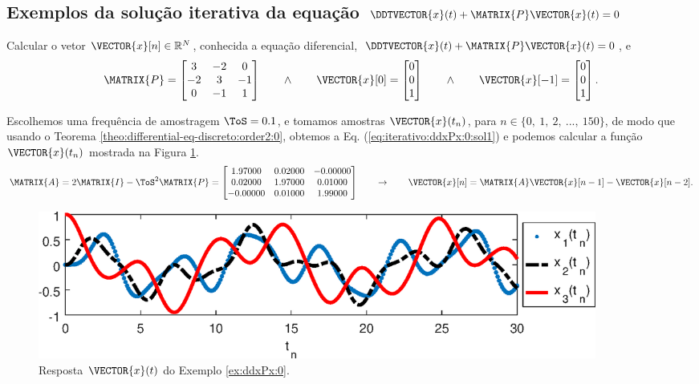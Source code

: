 \subsection{Exemplos da solução iterativa da equação $\DDTVECTOR{x}(t) + \MATRIX{P} \VECTOR{x}(t)=0$}

\begin{example}
\label{ex:iterativo:ddxPx:0}
Calcular o vetor $\VECTOR{x}[n] \in \mathbb{R}^{N}$,
conhecida a equação diferencial, $\DDTVECTOR{x}(t) + \MATRIX{P} \VECTOR{x}(t)=0$, e
\begin{equation}
\MATRIX{P}=
\begin{bmatrix}
3 & -2 & 0\\
-2 & 3 & -1\\
0 & -1 & 1
\end{bmatrix}
\qquad \wedge \qquad
\VECTOR{x}[0]=
\begin{bmatrix}
0\\
0\\
1
\end{bmatrix}
\qquad \wedge \qquad
\VECTOR{x}[-1]=
\begin{bmatrix}
0\\
0\\
1
\end{bmatrix}.
\end{equation}
\end{example}


\begin{SolutionT}
\label{ex:iterativo:ddxPx:0:sol1}
Escolhemos uma frequência de amostragem $\ToS=0.1$, e
tomamos amostras $\VECTOR{x}(t_n)$, para $n \in \{0,~ 1,~ 2,~ ...,~ 150\}$, 
de modo que usando o Teorema \ref{theo:differential-eq-discreto:order2:0}, 
obtemos a Eq. (\ref{eq:iterativo:ddxPx:0:sol1})
e podemos calcular a função $\VECTOR{x}(t_n)$ mostrada na Figura \ref{fig:ex:iterativo:ddxPx:0}.
\begin{equation}\label{eq:iterativo:ddxPx:0:sol1}
\MATRIX{A}=
2\MATRIX{I} -\ToS^2 \MATRIX{P}=
\begin{bmatrix}
   1.97000 & 0.02000 &-0.00000\\
   0.02000 & 1.97000 & 0.01000\\
  -0.00000 & 0.01000 & 1.99000
\end{bmatrix}
\qquad \rightarrow \qquad
\VECTOR{x}[n]=\MATRIX{A} \VECTOR{x}[n-1]-\VECTOR{x}[n-2].
\end{equation}
\end{SolutionT}

     \begin{figure}[!h]
         \centering
         \includegraphics[width=0.89\textwidth]{chapters/differential-eq-discreto/mfiles/segundoorder/segundooder1.eps}
         \caption{Resposta $\VECTOR{x}(t)$ do Exemplo \ref{ex:ddxPx:0}.}
         \label{fig:ex:iterativo:ddxPx:0}
     \end{figure}
